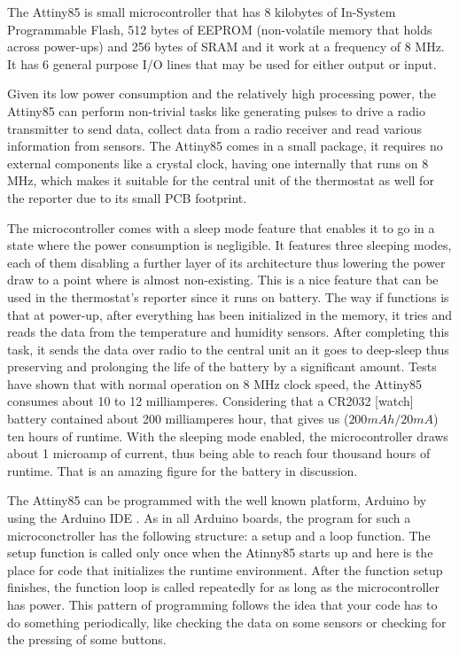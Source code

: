 \qquad The Attiny85 is small microcontroller that has 8 kilobytes of In-System Programmable Flash, 512 bytes of
EEPROM (non-volatile memory that holds across power-ups) and 256 bytes of SRAM and it work at a frequency of
8 MHz. It has 6 general purpose I/O lines that may be used for either output or input.

\qquad Given its low power consumption and the relatively high processing power, the Attiny85 can perform non-trivial
tasks like generating pulses to drive a radio transmitter to send data, collect data from a
radio receiver and read various information from sensors.
The Attiny85 comes in a small package, it requires no external components like a crystal clock, having one
internally that runs on 8 MHz, which makes it suitable for the central unit of the thermostat as well for the
reporter due to its small PCB footprint.

\qquad The microcontroller comes with a sleep mode feature that enables it to go in a state where the power
consumption is negligible. It features three sleeping modes, each of them disabling a further layer
of its architecture thus lowering the power draw to a point where is almost non-existing.
This is a nice feature that can be used in the thermostat's reporter since it runs on battery.
The way if functions is that at power-up, after everything has been initialized in the memory, it tries and
reads the data from the temperature and humidity sensors. After completing this task, it sends the data over
radio to the central unit an it goes to deep-sleep thus preserving and prolonging the life of the battery
by a significant amount. Tests \cite{website:attiny_sleep_tests} have shown that with normal operation on
8 MHz clock speed, the Attiny85 consumes about 10 to 12 milliamperes. Considering that a CR2032 [watch]
battery contained about 200 milliamperes hour, that gives us ($200 mAh / 20 mA$) ten hours of runtime.
With the sleeping mode enabled, the microcontroller draws about 1 microamp of current, thus being able to reach
four thousand hours of runtime. That is an amazing figure for the battery in discussion.

\qquad The Attiny85 can be programmed with the well known platform, Arduino by using the Arduino IDE
\cite{website:attiny85program}.
As in all Arduino boards, the program for such a microconctroller has the following structure: a setup
and a loop function. The setup function is called only once when the Atinny85 starts up and here is the place
for code that initializes the runtime environment. After the function setup finishes, the function loop
is called repeatedly for as long as the microcontroller has power. This pattern of programming follows the
idea that your code has to do something periodically, like checking the data on some sensors or checking for
the pressing of some buttons.

